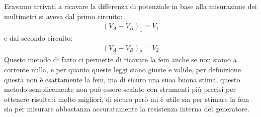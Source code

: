 \documentclass[a4paper, oneside]{article}
\begin{document}
    Eravamo arrivati a ricavare la differenza di potenziale in base alla misurazione dei multimetri si aveva dal primo circuito:
    \begin{gather*}
        (V_A - V_B)_1 = V_1
    \end{gather*}
    e dal secondo circuito:
    \begin{gather*}
        (V_A - V_B)_2 = V_2
    \end{gather*}
    Questo metodo di fatto ci permette di ricavare la fem anche se non siamo a corrente nulla, e per quanto queste leggi siano giuste e valide, per definizione questa non è esattamente la fem, ma di sicuro una suoa buona stima, questo metodo semplicemente non può essere scalato 
    con strumenti più precisi per ottenere risultati molto migliori, di sicuro però mi è utile sia per stimare la fem sia per misurare abbastanza accuratamente la resistenza interna del generatore.
\end{document}
